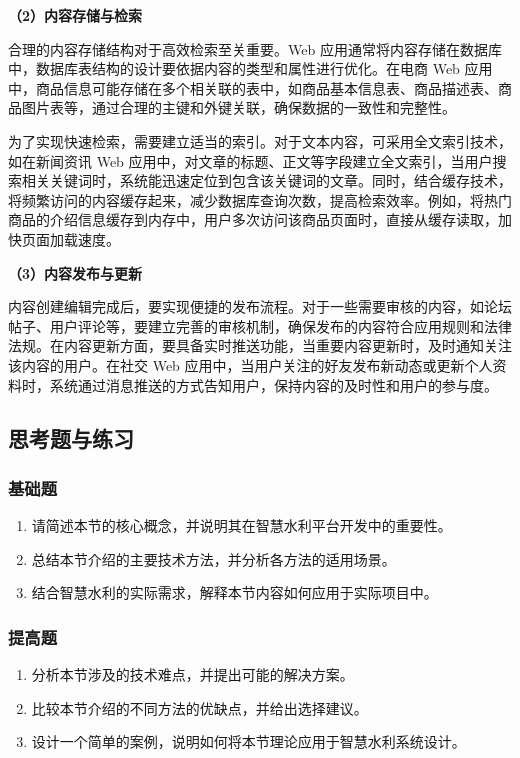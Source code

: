 \textbf{（2）内容存储与检索}

合理的内容存储结构对于高效检索至关重要。Web 应用通常将内容存储在数据库中，数据库表结构的设计要依据内容的类型和属性进行优化。在电商 Web 应用中，商品信息可能存储在多个相关联的表中，如商品基本信息表、商品描述表、商品图片表等，通过合理的主键和外键关联，确保数据的一致性和完整性。

为了实现快速检索，需要建立适当的索引。对于文本内容，可采用全文索引技术，如在新闻资讯 Web 应用中，对文章的标题、正文等字段建立全文索引，当用户搜索相关关键词时，系统能迅速定位到包含该关键词的文章。同时，结合缓存技术，将频繁访问的内容缓存起来，减少数据库查询次数，提高检索效率。例如，将热门商品的介绍信息缓存到内存中，用户多次访问该商品页面时，直接从缓存读取，加快页面加载速度。

\textbf{（3）内容发布与更新}

内容创建编辑完成后，要实现便捷的发布流程。对于一些需要审核的内容，如论坛帖子、用户评论等，要建立完善的审核机制，确保发布的内容符合应用规则和法律法规。在内容更新方面，要具备实时推送功能，当重要内容更新时，及时通知关注该内容的用户。在社交 Web 应用中，当用户关注的好友发布新动态或更新个人资料时，系统通过消息推送的方式告知用户，保持内容的及时性和用户的参与度。

\subsection{思考题与练习}\label{ux601dux8003ux9898ux4e0eux7ec3ux4e60-2}

\subsubsection{基础题}\label{ux57faux7840ux9898-2}

\begin{enumerate}
\def\labelenumi{\arabic{enumi}.}
\tightlist
\item
  请简述本节的核心概念，并说明其在智慧水利平台开发中的重要性。
\item
  总结本节介绍的主要技术方法，并分析各方法的适用场景。
\item
  结合智慧水利的实际需求，解释本节内容如何应用于实际项目中。
\end{enumerate}

\subsubsection{提高题}\label{ux63d0ux9ad8ux9898-2}

\begin{enumerate}
\def\labelenumi{\arabic{enumi}.}
\setcounter{enumi}{3}
\tightlist
\item
  分析本节涉及的技术难点，并提出可能的解决方案。
\item
  比较本节介绍的不同方法的优缺点，并给出选择建议。
\item
  设计一个简单的案例，说明如何将本节理论应用于智慧水利系统设计。
\end{enumerate}

